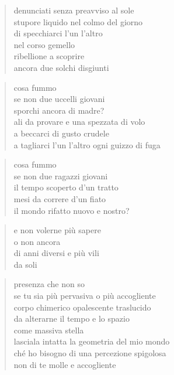 \begin{poem}
\begin{poem}
	\begin{verse}
		denunciati senza preavviso al sole\\
		stupore liquido nel colmo del giorno\\
		di specchiarci l'un l'altro\\
		nel corso gemello\\
		ribellione a scoprire\\
		ancora due solchi disgiunti
	\end{verse}

	\begin{verse}
		cosa fummo\\
		se non due uccelli giovani\\
		sporchi ancora di madre?\\
		ali da provare e una spezzata di volo\\
		a beccarci di gusto crudele\\
		a tagliarci l'un l'altro ogni guizzo di fuga
	\end{verse}

	\begin{verse}
		cosa fummo\\
		se non due ragazzi giovani\\
		il tempo scoperto d'un tratto\\
		mesi da correre d'un fiato\\
		il mondo rifatto nuovo e nostro?
	\end{verse}
	
	\begin{verse}
		e non volerne più sapere\\
		o non ancora\\
		di anni diversi e più vili\\
		da soli
	\end{verse}

\clearpage


	\begin{verse}
		presenza che non so\\
		se tu sia più pervasiva o più accogliente\\
		corpo chimerico opalescente traslucido\\
		da alterarne il tempo e lo spazio\\
		come massiva stella\\
		lasciala intatta la geometria del mio mondo\\
		ché ho bisogno di una percezione spigolosa\\
		non di te molle e accogliente
	\end{verse}


\end{poem}
\end{poem}

